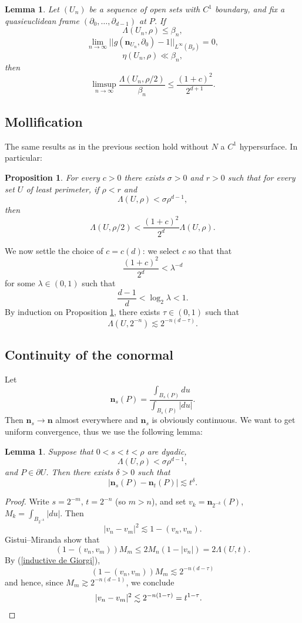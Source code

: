 \documentclass[reqno,12pt,letterpaper]{amsart}
\newcommand{\normal}{\mathbf n}
\newtheorem{lemma}[theorem]{Lemma}
\newtheorem{proposition}[theorem]{Proposition}
\theoremstyle{definition}
\numberwithin{equation}{section}
\begin{document}
\begin{lemma}
Let $(U_n)$ be a sequence of open sets with $C^1$ boundary, and fix a quasieuclidean frame $(\partial_0, \dots, \partial_{d - 1})$ at $P$.
If
$$\Lambda(U_n, \rho) \leq \beta_n,$$
$$\lim_{n \to \infty} ||g(\normal_{U_n}, \partial_0) - 1||_{L^\infty(B_\rho)} = 0,$$
$$\eta(U_n, \rho) \ll \beta_n,$$
then
$$\limsup_{n \to \infty} \frac{\Lambda(U_n, \rho/2)}{\beta_n} \leq \frac{(1 + c)^2}{2^{d + 1}}.$$
\end{lemma}

\subsection{Mollification}
The same results as in the previous section hold without $N$ a $C^1$ hypersurface.
In particular:

\begin{proposition}\label{de Giorgi}
For every $c > 0$ there exists $\sigma > 0$ and $r > 0$ such that for every set $U$ of least perimeter, if
$\rho < r$ and
$$\Lambda(U, \rho) < \sigma \rho^{d - 1},$$
then
$$\Lambda(U, \rho/2) < \frac{(1 + c)^2}{2^d} \Lambda(U, \rho).$$
\end{proposition}

We now settle the choice of $c = c(d)$: we select $c$ so that that
$$\frac{(1 + c)^2}{2^d} < \lambda^{-d}$$
for some $\lambda \in (0, 1)$ such that
$$\frac{d - 1}{d} < \log_2 \lambda < 1.$$
By induction on Proposition \ref{de Giorgi}, there exists $\tau \in (0, 1)$ such that
\begin{equation}\label{inductive de Giorgi}
\Lambda(U, 2^{-n}) \lesssim 2^{-n(d - \tau)}.
\end{equation}

\subsection{Continuity of the conormal}
Let
$$\normal_s(P) = \frac{\int_{B_s(P)} du}{\int_{B_s(P)} |du|}.$$
Then $\normal_s \to \normal$ almost everywhere and $\normal_s$ is obviously continuous.
We want to get uniform convergence, thus we use the following lemma:

\begin{lemma}
Suppose that $0 < s < t < \rho$ are dyadic,
$$\Lambda(U, \rho) < \sigma \rho^{d - 1},$$
and $P \in \partial U$.
Then there exists $\delta > 0$ such that
$$|\normal_s(P) - \normal_t(P)| \lesssim t^\delta.$$
\end{lemma}
\begin{proof}
Write $s = 2^{-m}$, $t = 2^{-n}$ (so $m > n$), and set $v_k = \normal_{2^{-k}}(P)$, $M_k = \int_{B_{2^{-k}}} |du|$.
Then
$$|v_n - v_m|^2 \lesssim 1 - (v_n, v_m).$$
Gistui--Miranda show that
$$(1 - (v_n, v_m))M_m \leq 2M_n(1 - |v_n|) = 2\Lambda(U, t).$$
By (\ref{inductive de Giorgi}),
$$(1 - (v_n, v_m))M_m \lesssim 2^{-n(d - \tau)}$$
and hence, since $M_m \gtrsim 2^{-n(d - 1)}$, we conclude
\begin{align*}
|v_n - v_m|^2 &\lesssim 2^{-n(1 - \tau)} = t^{1 - \tau}. \qedhere
\end{align*}
\end{proof}
\end{document}
